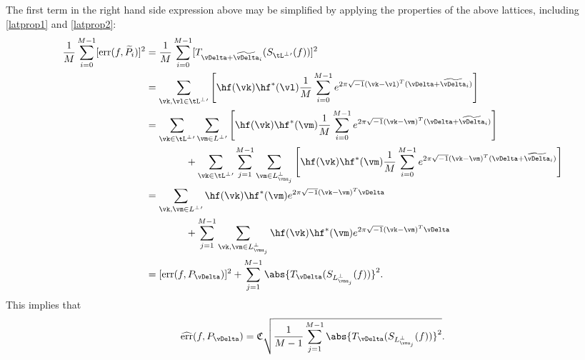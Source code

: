 \documentclass[12pt]{amsart}
\newcommand{\fudge}{\mathfrak{C}}
\newcommand{\tP}{\widetilde{P}}
\newcommand{\tvDelta}{\widetilde{\vDelta}}
\DeclareMathOperator{\err}{err}
\theoremstyle{definition}
\begin{document}
The first term in the right hand side expression above may be simplified by applying the properties of the above lattices, including \eqref{latprop1} and \eqref{latprop2}:
\begin{align*}
\frac{1}{M} \sum_{i=0}^{M-1} [\err(f,\tP_{i})]^2 &= \frac{1}{M} \sum_{i=0}^{M-1} [T_{\vDelta+\tvDelta_i}(S_{\tL^\perp{}'} (f))]^2\\
& = \sum_{\vk , \vl \in \tL^\perp{}'} \left[\hf(\vk) \hf^*(\vl) \frac{1}{M} \sum_{i=0}^{M-1} e^{2\pi\sqrt{-1}(\vk-\vl)^T(\vDelta+\tvDelta_i)} \right] \\
&= \sum_{\vk \in \tL^\perp{}'} \sum_{\vm \in L^\perp{}'} \left[\hf(\vk) \hf^*(\vm) \frac{1}{M} \sum_{i=0}^{M-1} e^{2\pi\sqrt{-1}(\vk-\vm)^T(\vDelta+\tvDelta_i)} \right] \\
& \qquad \qquad + \sum_{\vk \in \tL^\perp{}'} \sum_{j=1}^{M-1} \sum_{\vm \in L^\perp_{\vnu_j}} \left[\hf(\vk) \hf^*(\vm) \frac{1}{M} \sum_{i=0}^{M-1} e^{2\pi\sqrt{-1}(\vk-\vm)^T(\vDelta+\tvDelta_i)} \right] \\
&= \sum_{\vk , \vm \in L^\perp{}'} \hf(\vk) \hf^*(\vm) e^{2\pi\sqrt{-1}(\vk-\vm)^T\vDelta} \\
& \qquad \qquad + \sum_{j=1}^{M-1} \sum_{\vk,\vm \in L^\perp_{\vnu_j}} \hf(\vk) \hf^*(\vm) e^{2\pi\sqrt{-1}(\vk-\vm)^T\vDelta} \\
&= [\err(f,P_{\vDelta})]^2 + \sum_{j=1}^{M-1} \abs{T_{\vDelta}(S_{L^\perp_{\vnu_j}}(f))}^2.
\end{align*}
This implies that 
\begin{equation}
\widehat{\err}(f,P_{\vDelta}) = \fudge\sqrt{\frac{1}{M-1}\sum_{j=1}^{M-1} \abs{T_{\vDelta}(S_{L^\perp_{\vnu_j}}(f))}^2}.
\end{equation}






\end{document}

